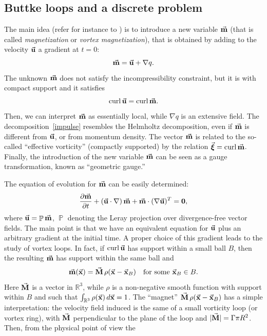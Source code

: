\documentclass[a4paper,11pt]{article}
\numberwithin{equation}{section}
\DeclareMathOperator{\prob}{{\mathbb P}}
\DeclareMathOperator{\curl}{curl}
\newcommand{\R}{\mathbb{R}}
\newcommand{\U}{\mbox{$\vec{\bf u}$}}
\newcommand{\x}{\mbox{$\vec{\bf x}$}}
\newcommand{\m}{\mbox{$\vec{\bf m}$}}
\newcommand{\bxi}{\mbox{$\vec{\boldsymbol \xi}$}}
\begin{document}
\subsection{Buttke loops and a discrete problem}
The main idea (refer for instance to \cite{MR1248421,MR95m:76043}) is
to introduce a new variable $\m$ (that is called \textit{magnetization} or
\textit{vortex magnetization}), that is obtained by adding to the 
velocity $\U$ a gradient at $t=0$:
\begin{equation}\label{impulse}
\m=\U+\nabla q.
\end{equation}
The unknown $\m$ does not satisfy the incompressibility constraint,
but it is with compact support and it satisfies
\begin{equation*}
\curl\U=\curl\m.
\end{equation*}
Then, we can interpret $\m$ as essentially local, while $\nabla q$
is an extensive field. The decomposition~\eqref{impulse} resembles the
Helmholtz decomposition, even if $\m$ is different from $\U$, or from
momentum density. The vector $\m$ is related to the so-called
``effective vorticity'' (compactly supported) by the relation
$\bxi=\curl\m$. Finally, the introduction of the new variable $\m$ can
be seen as a gauge transformation, known as ``geometric gauge.''\par  
%
The equation of evolution for $\m$ can be easily determined: 
\begin{equation*}
\frac{\partial\m}{\partial t}+(\U\cdot\nabla)\,\m+
\m\cdot(\nabla\U)^T={\bf0},
\end{equation*}
where $\U=\prob\m$, $\prob$ denoting the Leray projection over
divergence-free vector fields. The main point is that we have an
equivalent equation for $\U$ plus an arbitrary gradient at the initial
time. A proper choice of this gradient leads to the study of vortex
loops. In fact, if $\curl\U$ has support within a small ball $B$, then 
the resulting $\m$ has support within the same ball and 
\begin{equation*}
\m(\x)=\vec{\bf M}\,\rho(\x-{\x}_B)\quad\text{for some }{\x}_B\in B. 
\end{equation*}
Here $\vec{\bf M}$ is a vector in $\R^3$, while $\rho$ is a
non-negative smooth
function with support within $B$ and such that  
$\int_{\R^3}\rho(\x)\,d\x=1$. The ``magnet'' $\vec{\bf
  M}\,\rho(\x-{\x}_B)$ has a simple interpretation: the velocity field
induced is the same of a small vorticity loop (or vortex ring), with
$\vec{\bf M}$ perpendicular to the plane of the loop and $|\vec{\bf
  M}|=\Gamma \pi R^2$. Then, from the physical point of view the
\end{document}
